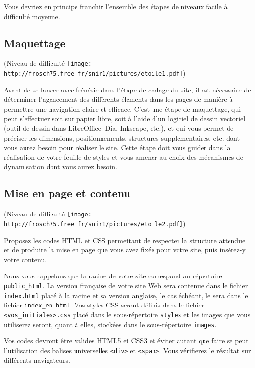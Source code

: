\documentclass[a4paper,12pt]{article}
\newcommand\Code[1]{\textcolor{couleur_code}{\texttt{#1}}}
\begin{document}
Vous devriez en principe franchir l'ensemble des étapes de niveaux \og{}facile\fg{}
à \og{}difficulté moyenne\fg{}.

\subsection{Maquettage}
(Niveau de difficulté \texttt{[image: http://frosch75.free.fr/snir1/pictures/etoile1.pdf]})

Avant de se lancer avec frénésie dans l'étape de codage du site, il est 
nécessaire de déterminer l'agencement des différents éléments dans les pages 
de manière à permettre une navigation claire et efficace.  
C'est une étape de maquettage, qui peut s'effectuer soit sur papier libre, 
soit à l'aide d'un logiciel de dessin vectoriel (outil de dessin dans 
LibreOffice, Dia, Inkscape, etc.), et qui vous permet de préciser les dimensions,
positionnements, structures supplémentaires, etc. dont vous aurez besoin pour
réaliser le site. 
Cette étape doit vous guider dans la réalisation de votre feuille de styles 
et vous amener au choix des mécanismes de dynamisation dont vous aurez besoin.

\subsection{Mise en page et contenu}
(Niveau de difficulté \texttt{[image: http://frosch75.free.fr/snir1/pictures/etoile2.pdf]})

Proposez les codes HTML et CSS permettant de respecter la structure attendue et
de produire la mise en page que vous avez fixée pour votre site, puis insérez-y 
votre contenu. 

Nous vous rappelons que la racine de votre site correspond au répertoire 
\Code{public\_html}. La version française de votre site Web sera contenue
dans le fichier \Code{index.html} placé à la racine et sa version anglaise, le
cas échéant, le sera dans le fichier \Code{index\_en.html}. Vos styles CSS
seront définis dans le fichier \Code{<vos\_initiales>.css} placé dans le 
sous-répertoire \Code{styles} et les images que vous utiliserez seront, 
quant à elles, stockées dans le sous-répertoire \Code{images}.

Vos codes devront être valides HTML5 et CSS3 et éviter autant que faire se peut
l'utilisation des balises universelles \texttt{<div>} et \texttt{<span>}.
Vous vérifierez le résultat sur différents navigateurs.
\end{document}
